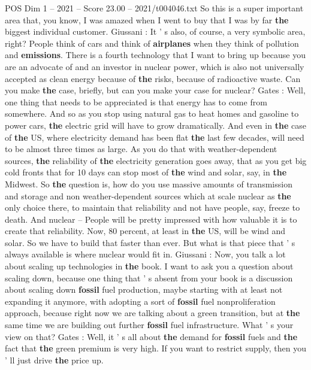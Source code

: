 \begin{textsample}{POS Dim 1 – 2021 – Score 23.00 – 2021/t004046.txt}
So this is a super important area that, you know, I was amazed when I went to buy that I was by far \textbf{the} biggest individual customer.
Giussani : It ' s also, of course, a very symbolic area, right?
People think of cars and think of \textbf{airplanes} when they think of pollution and \textbf{emissions}.
There is a fourth technology that I want to bring up because you are an advocate of and an investor in nuclear power, which is also not universally accepted as clean energy because of \textbf{the} risks, because of radioactive waste.
Can you make \textbf{the} case, briefly, but can you make your case for nuclear?
Gates : Well, one thing that needs to be appreciated is that energy has to come from somewhere.
And so as you stop using natural gas to heat homes and gasoline to power cars, \textbf{the} electric grid will have to grow dramatically.
And even in \textbf{the} case of \textbf{the} US, where electricity demand has been flat \textbf{the} last few decades, will need to be almost three times as large.
As you do that with weather-dependent sources, \textbf{the} reliability of \textbf{the} electricity generation goes away, that as you get big cold fronts that for 10 days can stop most of \textbf{the} wind and solar, say, in \textbf{the} Midwest.
So \textbf{the} question is, how do you use massive amounts of transmission and storage and non weather-dependent sources which at scale nuclear as \textbf{the} only choice there, to maintain that reliability and not have people, say, freeze to death.
And nuclear -- People will be pretty impressed with how valuable it is to create that reliability.
Now, 80 percent, at least in \textbf{the} US, will be wind and solar.
So we have to build that faster than ever.
But what is that piece that ' s always available is where nuclear would fit in.
Giussani : Now, you talk a lot about scaling up technologies in \textbf{the} book.
I want to ask you a question about scaling down, because one thing that ' s absent from your book is a discussion about scaling down \textbf{fossil} fuel production, maybe starting with at least not expanding it anymore, with adopting a sort of \textbf{fossil} fuel nonproliferation approach, because right now we are talking about a green transition, but at \textbf{the} same time we are building out further \textbf{fossil} fuel infrastructure.
What ' s your view on that?
Gates : Well, it ' s all about \textbf{the} demand for \textbf{fossil} fuels and \textbf{the} fact that \textbf{the} green premium is very high.
If you want to restrict supply, then you ' ll just drive \textbf{the} price up.

\end{textsample}
